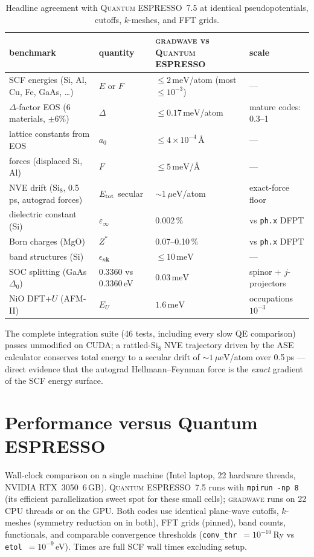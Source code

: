 \documentclass[11pt]{article}
\newcommand{\gw}{\textsc{gradwave}}
\newcommand{\qe}{\textsc{Quantum ESPRESSO}}
\newcommand{\meV}{\,\mathrm{meV}}
\newcommand{\ueV}{\,\mu\mathrm{eV}}
\begin{document}
\begin{table}[h]\centering
\caption{Headline agreement with \qe{}~7.5 at identical pseudopotentials,
cutoffs, $k$-meshes, and FFT grids.}
\begin{tabular}{llll}
\toprule
benchmark & quantity & \gw{} vs \qe{} & scale \\
\midrule
SCF energies (Si, Al, Cu, Fe, GaAs, \ldots) & $E$ or $F$ & $\leq 2\meV$/atom (most $\leq 10^{-3}$) & --- \\
$\Delta$-factor EOS (6 materials, $\pm 6\%$) & $\Delta$ & $\leq 0.17\meV$/atom & mature codes: 0.3--1 \\
lattice constants from EOS & $a_0$ & $\leq 4\times10^{-4}$\,\AA & --- \\
forces (displaced Si, Al) & $F$ & $\leq 5\meV$/\AA & --- \\
NVE drift (Si$_8$, 0.5\,ps, autograd forces) & $E_{\rm tot}$ secular & $\sim 1\ueV$/atom & exact-force floor \\
dielectric constant (Si) & $\varepsilon_\infty$ & 0.002\,\% & vs \texttt{ph.x} DFPT \\
Born charges (MgO) & $Z^*$ & 0.07--0.10\,\% & vs \texttt{ph.x} DFPT \\
band structures (Si) & $\epsilon_{n\mathbf{k}}$ & $\leq 10\meV$ & --- \\
SOC splitting (GaAs $\Delta_0$) & $0.3360$ vs $0.3360$\,eV & $0.03\meV$ & spinor + $j$-projectors \\
NiO DFT+$U$ (AFM-II) & $E_U$ & $1.6\meV$ & occupations $10^{-3}$ \\
\bottomrule
\end{tabular}
\end{table}

The complete integration suite (46 tests, including every slow QE comparison)
passes unmodified on CUDA; a rattled-Si$_8$ NVE trajectory driven by the ASE
calculator conserves total energy to a secular drift of
$\sim 1\ueV$/atom over 0.5\,ps --- direct evidence that the autograd
Hellmann--Feynman force is the \emph{exact} gradient of the SCF energy
surface.

\section{Performance versus Quantum ESPRESSO}
\label{sec:speed}

Wall-clock comparison on a single machine (Intel laptop, 22 hardware threads,
NVIDIA RTX~3050~6\,GB). \qe{}~7.5 runs with \texttt{mpirun -np 8} (its
efficient parallelization sweet spot for these small cells); \gw{} runs on
22 CPU threads or on the GPU. Both codes use identical plane-wave cutoffs,
$k$-meshes (symmetry reduction on in both), FFT grids (pinned), band counts,
functionals, and comparable convergence thresholds
(\texttt{conv\_thr}~$=10^{-10}$\,Ry vs \texttt{etol}~$=10^{-9}$\,eV).
Times are full SCF wall times excluding setup.
\end{document}
